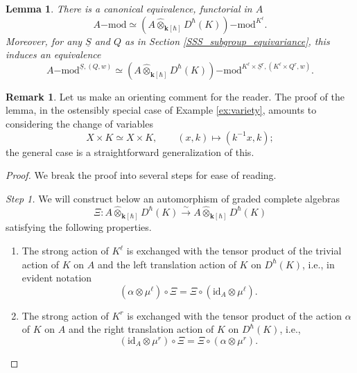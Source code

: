 \documentclass{amsart}
\newtheorem{Lem}[Thm]{Lemma}
\theoremstyle{definition}
\newtheorem{Rem}[Thm]{Remark}
\newcommand{\lmod}{\on{-mod}}
\newcommand{\on}{\mathrm}
\newcommand{\bk}{\mathbf{k}}
\newcommand{\wotimes}{\widehat{\otimes}_{\bk[\hbar]}}
\numberwithin{equation}{section}
\begin{document}
\begin{Lem} \label{l:dividebyK}There is a canonical equivalence, functorial in $A$
$$A\lmod \simeq (A \widehat{\otimes}_{\bk[\hbar]}D^\hbar(K))\lmod^{K^\ell}.$$    
Moreover, for any $\underline{S}$ and $Q$ as in Section \ref{SSS_subgroup_equivariance}, this induces an equivalence 
$$A\lmod^{\underline{S}, (Q,w)} \simeq (A \widehat{\otimes}_{\bk[\hbar]} D^\hbar(K))\lmod^{K^\ell \times \underline{S}^r, (K^\ell\times Q^r, w)}.$$
\end{Lem}

{
\begin{Rem} Let us make an orienting comment for the reader. The proof of the lemma, in the ostensibly special case of Example \ref{ex:variety}, amounts to considering the change of variables 
$$X \times K \simeq X \times K, \quad \quad (x, k) \mapsto (k^{-1}x, k);$$
the general case is a straightforward generalization of this.  \end{Rem}

\begin{proof} We break the proof into several steps for ease of reading. 

{\it Step 1.} We will construct below an automorphism of graded complete algebras
$$\Xi: A \wotimes D^\hbar(K) \xrightarrow{\sim} A \wotimes D^\hbar(K)$$
satisfying the following properties. 

\begin{enumerate}
\item The strong action of $K^\ell$ is exchanged with the tensor product of the trivial action of $K$ on $A$ and the left translation action of $K$ on $D^\hbar(K)$, i.e., in evident notation
$$(\alpha \otimes \mu^\ell) \circ \Xi   =   \Xi \circ (\on{id}_A \otimes \mu^\ell).$$

\item The strong action of $K^r$ is exchanged with the tensor product of the action $\alpha$ of $K$ on $A$ and the right translation action of $K$ on $D^\hbar(K)$, i.e., 
$$(\on{id}_A \otimes \mu^r) \circ \Xi  =  \Xi \circ (\alpha \otimes \mu^r).$$
    

\end{enumerate}
\end{proof}}
\end{document}
